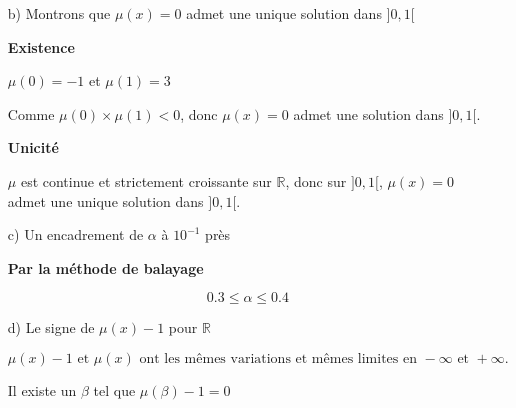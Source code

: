 \documentclass[12pt,a4paper]{article}
\begin{document}
\begin{itemize}
\begin{itemize}
        \end{itemize}
    \item[b)] Montrons que \( \mu(x) = 0 \) admet une unique solution dans \( ]0,1[ \)

        \textbf{Existence}

        \( \mu(0) = -1 \) et \( \mu(1) = 3 \)

        Comme \( \mu(0) \times \mu(1) < 0 \), donc \( \mu(x) = 0 \) admet une solution dans \( ]0,1[ \).

        \textbf{Unicité}

        \( \mu \) est continue et strictement croissante sur \( \mathbb{R} \), donc sur \( ]0,1[ \), \( \mu(x) = 0 \) admet une unique solution dans \( ]0,1[ \).

    \item [c)] Un encadrement de \( \alpha \) à \( 10^{-1} \) près

          \textbf{Par la méthode de balayage}

          \begin{center}
          \end{center}

          \[ 0.3 \leq \alpha \leq 0.4 \]

    \item [d)] Le signe de \( \mu(x) - 1 \) pour \( \mathbb{R} \)

          \[
              \mu(x) - 1 \text{ et } \mu(x) \text{ ont les mêmes variations et mêmes limites en } -\infty \text{ et } +\infty.
          \]

          Il existe un \( \beta \) tel que  $\mu(\beta)-1 = 0$


\end{itemize}
\end{document}
